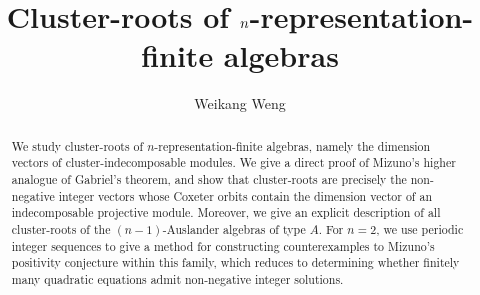 \documentclass[11pt,a4paper]{amsart}
\theoremstyle{definition}
\numberwithin{equation}{section}
\newcommand{\0}{\mathbf{0}}
\begin{document}
	

	\title[Cluster-roots of $\lowercase{n}$-representation-finite algebras]{Cluster-roots of $\lowercase{n}$-representation-finite algebras}

	
	\author[W. Weng] {Weikang Weng}

	\makeatletter {} \makeatother
	
	

	\begin{abstract} 
	 We study cluster-roots of $n$-representation-finite algebras, namely the dimension vectors of
	 cluster-indecomposable modules. We give a direct proof of Mizuno's higher analogue of Gabriel's theorem, and show that cluster-roots are precisely the non-negative
	 integer vectors whose Coxeter orbits contain
	 the dimension vector of an indecomposable projective module.	 
	 Moreover, we give an explicit
	 description of all cluster-roots of the $(n-1)$-Auslander algebras
	 of type $A$. For $n=2$, we use periodic integer sequences to give a method for constructing counterexamples to Mizuno's positivity conjecture  within this family, which reduces to determining whether finitely many quadratic equations admit  non-negative integer solutions.
	\end{abstract}
	
	\maketitle
	
\end{document}
